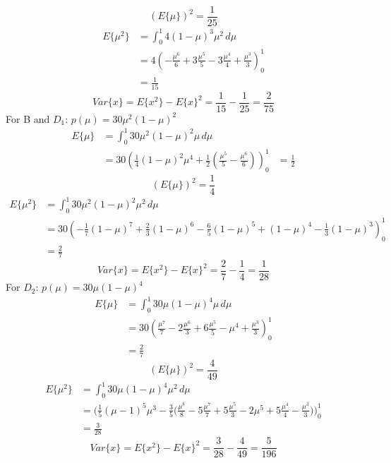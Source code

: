\begin{equation*}
(E\{\mu\})^2 = \frac{1}{25}
\end{equation*}
\begin{align*}
E\{\mu^2\} &= \int_0^1 4(1-\mu)^3\mu^2 \,d\mu\\
&= 4(-\frac{\mu^6}{6} + 3\frac{\mu^5}{5} - 3\frac{\mu^4}{4} + \frac{\mu^3}{3})_0^1 \\
&= \frac{1}{15}
\end{align*}
\begin{equation*}
Var\{x\} =E\{x^2\} - E\{x\}^2  = \frac{1}{15} - \frac{1}{25} = \frac{2}{75}
\end{equation*}
For B and $D_1$: $p(\mu) = 30\mu^2(1-\mu)^2$
\begin{align*}
E\{\mu\} &= \int_0^1 30\mu^2(1-\mu)^2\mu \,d\mu \\
&= 30 (\frac{1}{4}(1-\mu)^2\mu^4 + \frac{1}{2}(\frac{\mu^5}{5} - \frac{\mu^6}{6}))_0^1
&= \frac{1}{2}
\end{align*}
\begin{equation*}
(E\{\mu\})^2 = \frac{1}{4}
\end{equation*}
\begin{align*}
E\{\mu^2\} &= \int_0^1 30\mu^2(1-\mu)^2\mu^2 \,d\mu \\
&= 30 (-\frac{1}{7}(1-\mu)^7 + \frac{2}{3}(1-\mu)^6- \frac{6}{5}(1-\mu)^5 + (1-\mu)^4 - \frac{1}{3}(1-\mu)^3)_0^1\\
&= \frac{2}{7}
\end{align*}
\begin{equation*}
Var\{x\} =E\{x^2\} - E\{x\}^2  = \frac{2}{7} - \frac{1}{4} = \frac{1}{28}
\end{equation*}
For $D_2$: $p(\mu) = 30\mu(1-\mu)^4$
\begin{align*}
E\{\mu\} &= \int_0^1 30\mu(1-\mu)^4\mu \,d\mu \\
&= 30 (\frac{\mu^7}{7} - 2\frac{\mu^6}{3} + 6\frac{\mu^5}{5} - \mu^4 + \frac{\mu^3}{3})_0^1\\
&= \frac{2}{7}
\end{align*}
\begin{equation*}
(E\{\mu\})^2 = \frac{4}{49}
\end{equation*}
\begin{align*}
E\{\mu^2\} &= \int_0^1 30\mu(1-\mu)^4\mu^2 \,d\mu \\
&= \Big( \frac{1}{5}(\mu-1)^5\mu^3 - \frac{3}{5}\Big( \frac{\mu^8}{8} - 5\frac{\mu^7}{7} + 5\frac{\mu^5}{3} -2\mu^5 + 5\frac{\mu^4}{4} -\frac{\mu^3}{3}\Big) \Big)_0^1\\
&= \frac{3}{28}
\end{align*}
\begin{equation*}
Var\{x\} =E\{x^2\} - E\{x\}^2  = \frac{3}{28} - \frac{4}{49} = \frac{5}{196}
\end{equation*}

